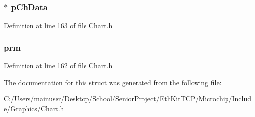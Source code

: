 \subsubsection[{p\+Ch\+Data}]{$\ast$ p\+Ch\+Data}\label{struct_c_h_a_r_t_aadacc722a60920a882557521f354d44a}


Definition at line 163 of file Chart.\+h.

\hypertarget{struct_c_h_a_r_t_a280931f1f217395d6a69cc538a5e9cc1}{}
\subsubsection[{prm}]{ prm}\label{struct_c_h_a_r_t_a280931f1f217395d6a69cc538a5e9cc1}


Definition at line 162 of file Chart.\+h.



The documentation for this struct was generated from the following file\+:\begin{DoxyCompactItemize}
\item 
C\+:/\+Users/mainuser/\+Desktop/\+School/\+Senior\+Project/\+Eth\+Kit\+T\+C\+P/\+Microchip/\+Include/\+Graphics/\hyperlink{_chart_8h}{Chart.\+h}\end{DoxyCompactItemize}
